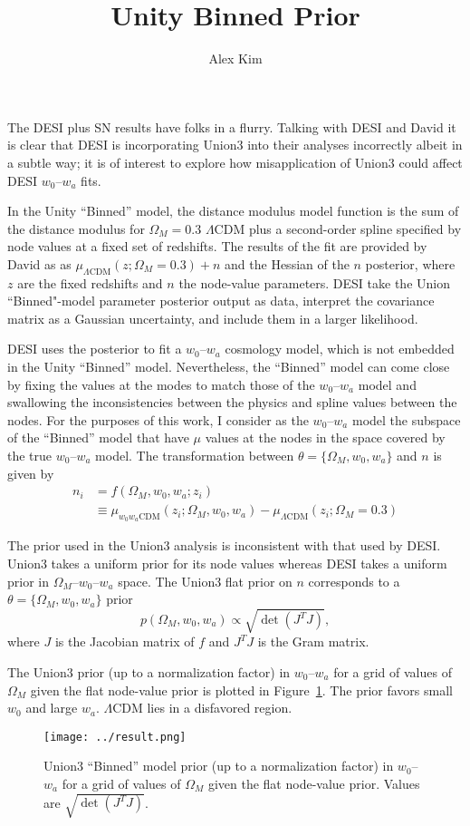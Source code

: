 \documentclass[11pt, oneside]{article}   	%
\title{Unity Binned Prior}
\author{Alex Kim}
\begin{document}
\maketitle

The DESI plus SN results have folks in a flurry.  Talking with DESI and David it is clear that DESI is incorporating Union3
into their analyses incorrectly albeit in a subtle way;  it is of interest to explore how misapplication
of Union3 could affect  DESI $w_0$--$w_a$  fits.

In the Unity ``Binned'' model, the distance modulus model function
is the sum of the distance modulus for $\Omega_M=0.3$  $\Lambda$CDM plus a second-order spline specified by node values
at a fixed set of redshifts.  The results of the fit are provided by David as as
$\mu_{\Lambda \text{CDM}}(z;\Omega_M=0.3) + n$ and the  Hessian of the $n$ posterior,
where $z$ are the fixed redshifts and $n$ the node-value parameters.
DESI take the Union ``Binned"-model parameter posterior output as data, interpret the covariance matrix as a Gaussian uncertainty,
and include them in a larger likelihood. 

DESI uses the posterior to fit a $w_0$--$w_a$ cosmology model, which is not embedded in the Unity ``Binned'' model.  Nevertheless,
the ``Binned'' model can come close by fixing the values at the modes to match those of the $w_0$--$w_a$  model and swallowing the
inconsistencies between the physics and spline values between the nodes.  For the purposes of this work, I consider
as the  $w_0$--$w_a$ model  the subspace
of the ``Binned'' model that have $\mu$ values at the nodes in the space  covered by the true $w_0$--$w_a$
model.  The transformation between $\theta=\{\Omega_M, w_0, w_a\}$ and $n$ is given by
\begin{align}
	n_i &= f(\Omega_M, w_0, w_a; z_i) \\
	& \equiv \mu_{w_0 w_a \text{CDM}}(z_i;\Omega_M, w_0, w_a)  - \mu_{\Lambda \text{CDM}}(z_i;\Omega_M=0.3) 
\end{align}

The prior used in the Union3 analysis is inconsistent with that used by DESI.  Union3 takes a uniform prior for its node values whereas
DESI takes a uniform prior in $\Omega_M$--$w_0$--$w_a$ space.  The Union3 flat prior
on $n$  corresponds to a $\theta=\{\Omega_M, w_0, w_a\}$ prior
\begin{equation}
p(\Omega_M, w_0,w_a) \propto \sqrt{\det{\left(J^T J\right)}},
\end{equation}
where $J$ is the Jacobian matrix of $f$
and $J^TJ$ is the Gram matrix.

The Union3 prior  (up to a normalization factor)  in $w_0$--$w_a$  for a grid of values of $\Omega_M$
given the flat node-value prior is plotted in Figure~\ref{fig:priors}. 
The prior favors small $w_0$ and large $w_a$.  $\Lambda$CDM lies in a disfavored region.
\begin{figure}[htbp] %
   \centering
   \texttt{[image: ../result.png]} 
   \caption{Union3 ``Binned'' model prior (up to a normalization factor)  in $w_0$--$w_a$ for a grid of values of $\Omega_M$ given the flat node-value prior.
   Values are $\sqrt{\det{\left(J^T J\right)}}$.}
   \label{fig:priors}
\end{figure}
\end{document}
